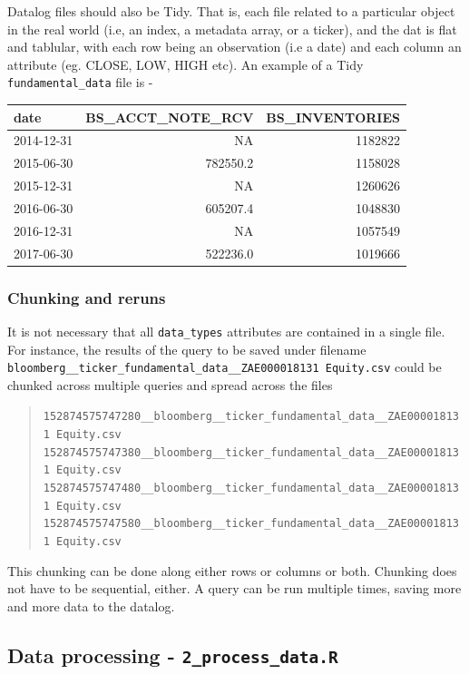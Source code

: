 \documentclass[11pt,preprint, authoryear]{elsarticle}
\numberwithin{equation}{section}
\numberwithin{figure}{section}
\numberwithin{table}{section}
\begin{document}
Datalog files should also be Tidy. That is, each file related to a
particular object in the real world (i.e, an index, a metadata array, or
a ticker), and the dat is flat and tablular, with each row being an
observation (i.e a date) and each column an attribute (eg. CLOSE, LOW,
HIGH etc). An example of a Tidy \texttt{fundamental\_data} file is -

\begin{longtable}[]{@{}lrr@{}}
\toprule
date & BS\_ACCT\_NOTE\_RCV & BS\_INVENTORIES\tabularnewline
\midrule
\endhead
2014-12-31 & NA & 1182822\tabularnewline
2015-06-30 & 782550.2 & 1158028\tabularnewline
2015-12-31 & NA & 1260626\tabularnewline
2016-06-30 & 605207.4 & 1048830\tabularnewline
2016-12-31 & NA & 1057549\tabularnewline
2017-06-30 & 522236.0 & 1019666\tabularnewline
\bottomrule
\end{longtable}

\subsubsection{Chunking and reruns}\label{chunking-and-reruns}

It is not necessary that all \texttt{data\_types} attributes are
contained in a single file. For instance, the results of the query to be
saved under filename
\texttt{bloomberg\_\_ticker\_fundamental\_data\_\_ZAE000018131\ Equity.csv}
could be chunked across multiple queries and spread across the files

\begin{quote}
\texttt{152874575747280\_\_bloomberg\_\_ticker\_fundamental\_data\_\_ZAE000018131\ Equity.csv}\\
\texttt{152874575747380\_\_bloomberg\_\_ticker\_fundamental\_data\_\_ZAE000018131\ Equity.csv}\\
\texttt{152874575747480\_\_bloomberg\_\_ticker\_fundamental\_data\_\_ZAE000018131\ Equity.csv}\\
\texttt{152874575747580\_\_bloomberg\_\_ticker\_fundamental\_data\_\_ZAE000018131\ Equity.csv}
\end{quote}

This chunking can be done along either rows or columns or both. Chunking
does not have to be sequential, either. A query can be run multiple
times, saving more and more data to the datalog.

\newpage

\subsection{\texorpdfstring{Data processing -
\texttt{2\_process\_data.R}}{Data processing - 2\_process\_data.R}}\label{data-processing---2_process_data.r}
\end{document}
